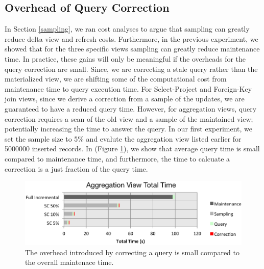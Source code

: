 \subsection{Overhead of Query Correction}
In Section \ref{sampling}, we ran cost analyses to argue that sampling can greatly reduce delta view and refresh costs.
Furthermore, in the previous experiment, we showed that for the three specific views sampling can greatly reduce maintenance time.
In practice, these gains will only be meaningful if the overheads for the query correction are small.
Since, we are correcting a stale query rather than the materialized view, we are shifting some of the computational cost from maintenance time to query execution time.
For Select-Project and Foreign-Key join views, since we derive a correction from a sample of the updates, we are guaranteed to have 
a reduced query time. 
However, for aggregation views, query correction requires a scan of the old view and a sample of the maintained view; potentially increasing the time to 
answer the query.
In our first experiment, we set the sample size to 5\% and evalute the aggregation view listed earlier for 5000000 inserted records. 
In (Figure \ref{exp10overheads}), we show that average query time is small compared to maintenance time, and furthermore, 
the time to calcuate a correction is a just fraction of the query time.
\begin{figure}[h]
\label{exp10overheads}
\centering
 \includegraphics[width=\columnwidth]{exp/total_time_agg_view.png}
 \caption{The overhead introduced by correcting a query is small compared to the overall maintenace time.}
\end{figure}

